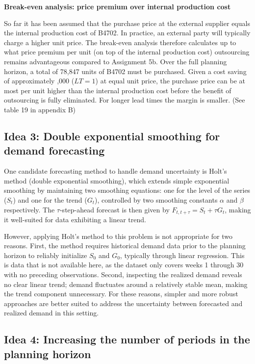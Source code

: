 \documentclass[a4paper,faculty=eb,language=en,doctype=article,sftitles=false]{ugent-doc}
\begin{document}
\vspace{0.5em}
\textbf{Break-even analysis: price premium over internal production cost}

So far it has been assumed that the purchase price at the external supplier equals the internal production cost of B4702. In practice, an external party will typically charge a higher unit price. The break-even analysis therefore calculates up to what price premium per unit (on top of the internal production cost) outsourcing remains advantageous compared to Assignment 5b. Over the full planning horizon, a total of 78,847 units of B4702 must be purchased. Given a cost saving of approximately ,000 ($LT = 1$) at equal unit price, the purchase price can be at most  per unit higher than the internal production cost before the benefit of outsourcing is fully eliminated. For longer lead times the margin is smaller. (See table 19 in appendix B)

\subsection*{Idea 3: Double exponential smoothing for demand forecasting}

One candidate forecasting method to handle demand uncertainty is Holt's method (double exponential smoothing), which extends simple exponential smoothing by maintaining two smoothing equations: one for the level of the series ($S_t$) and one for the trend ($G_t$), controlled by two smoothing constants $\alpha$ and $\beta$ respectively. The $\tau$-step-ahead forecast is then given by $F_{t,t+\tau} = S_t + \tau G_t$, making it well-suited for data exhibiting a linear trend.

However, applying Holt's method to this problem is not appropriate for two reasons. First, the method requires historical demand data prior to the planning horizon to reliably initialize $S_0$ and $G_0$, typically through linear regression. This is data that is not available here, as the dataset only covers weeks 1 through 30 with no preceding observations. Second, inspecting the realized demand reveals no clear linear trend; demand fluctuates around a relatively stable mean, making the trend component unnecessary. For these reasons, simpler and more robust approaches are better suited to address the uncertainty between forecasted and realized demand in this setting.

\subsection*{Idea 4: Increasing the number of periods in the planning horizon}
\end{document}
